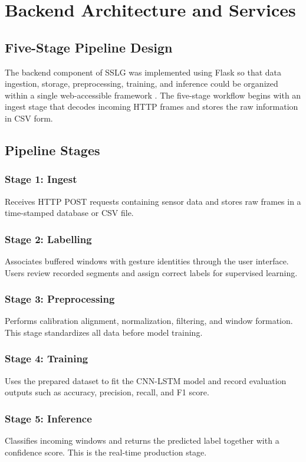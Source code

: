 \documentclass[12pt,a4paper]{report}
\begin{document}
\section{Backend Architecture and Services}
\label{sec:impl_backend}

\subsection{Five-Stage Pipeline Design}
The backend component of SSLG was implemented using Flask so that data ingestion, storage, preprocessing, training, and inference could be organized within a single web-accessible framework \cite{flask}. The five-stage workflow begins with an ingest stage that decodes incoming HTTP frames and stores the raw information in CSV form.

\subsection{Pipeline Stages}

\subsubsection{Stage 1: Ingest}
Receives HTTP POST requests containing sensor data and stores raw frames in a time-stamped database or CSV file.

\subsubsection{Stage 2: Labelling}
Associates buffered windows with gesture identities through the user interface. Users review recorded segments and assign correct labels for supervised learning.

\subsubsection{Stage 3: Preprocessing}
Performs calibration alignment, normalization, filtering, and window formation. This stage standardizes all data before model training.

\subsubsection{Stage 4: Training}
Uses the prepared dataset to fit the CNN-LSTM model and record evaluation outputs such as accuracy, precision, recall, and F1 score.

\subsubsection{Stage 5: Inference}
Classifies incoming windows and returns the predicted label together with a confidence score. This is the real-time production stage.
\end{document}

